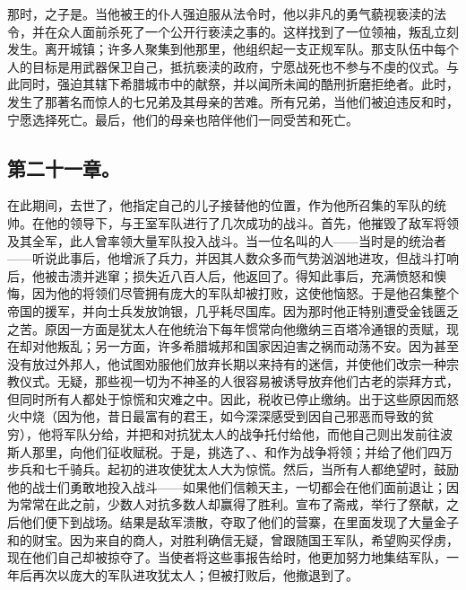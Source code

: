 那时，之子是。当他被王的仆人强迫服从法令时，他以非凡的勇气藐视亵渎的法令，并在众人面前杀死了一个公开行亵渎之事的。这样找到了一位领袖，叛乱立刻发生。离开城镇；许多人聚集到他那里，他组织起一支正规军队。那支队伍中每个人的目标是用武器保卫自己，抵抗亵渎的政府，宁愿战死也不参与不虔的仪式。与此同时，强迫其辖下希腊城市中的献祭，并以闻所未闻的酷刑折磨拒绝者。此时，发生了那著名而惊人的七兄弟及其母亲的苦难。所有兄弟，当他们被迫违反和时，宁愿选择死亡。最后，他们的母亲也陪伴他们一同受苦和死亡。\par


\subsection{第二十一章。}

在此期间，去世了，他指定自己的儿子接替他的位置，作为他所召集的军队的统帅。在他的领导下，与王室军队进行了几次成功的战斗。首先，他摧毁了敌军将领及其全军，此人曾率领大量军队投入战斗。当一位名叫的人——当时是的统治者——听说此事后，他增派了兵力，并因其人数众多而气势汹汹地进攻，但战斗打响后，他被击溃并逃窜；损失近八百人后，他返回了。得知此事后，充满愤怒和懊悔，因为他的将领们尽管拥有庞大的军队却被打败，这使他恼怒。于是他召集整个帝国的援军，并向士兵发放饷银，几乎耗尽国库。因为那时他正特别遭受金钱匮乏之苦。原因一方面是犹太人在他统治下每年惯常向他缴纳三百塔冷通银的贡赋，现在却对他叛乱；另一方面，许多希腊城邦和国家因迫害之祸而动荡不安。因为甚至没有放过外邦人，他试图劝服他们放弃长期以来持有的迷信，并使他们改宗一种宗教仪式。无疑，那些视一切为不神圣的人很容易被诱导放弃他们古老的崇拜方式，但同时所有人都处于惊慌和灾难之中。因此，税收已停止缴纳。出于这些原因而怒火中烧（因为他，昔日最富有的君王，如今深深感受到因自己邪恶而导致的贫穷），他将军队分给，并把和对抗犹太人的战争托付给他，而他自己则出发前往波斯人那里，向他们征收赋税。于是，挑选了、、和作为战争将领；并给了他们四万步兵和七千骑兵。起初的进攻使犹太人大为惊慌。然后，当所有人都绝望时，鼓励他的战士们勇敢地投入战斗——如果他们信赖天主，一切都会在他们面前退让；因为常常在此之前，少数人对抗多数人却赢得了胜利。宣布了斋戒，举行了祭献，之后他们便下到战场。结果是敌军溃散，夺取了他们的营寨，在里面发现了大量金子和的财宝。因为来自的商人，对胜利确信无疑，曾跟随国王军队，希望购买俘虏，现在他们自己却被掠夺了。当使者将这些事报告给时，他更加努力地集结军队，一年后再次以庞大的军队进攻犹太人；但被打败后，他撤退到了。\par

